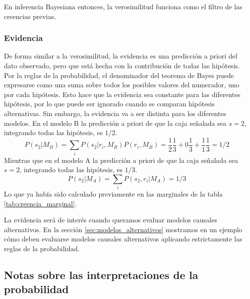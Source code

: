 \documentclass[a4paper,10pt]{book}
\theoremstyle{definition}
\begin{document}

En inferencia Bayesiana entonces, la verosimilitud funciona como el filtro de las creencias previas. 

\subsubsection*{Evidencia}

De forma similar a la verosimilitud, la evidencia es una predicci\'on a priori del dato observado, pero que est\'a hecha con la contribuci\'on de todas las hip\'otesis.
%
Por la reglas de la probabilidad, el denominador del teorema de Bayes puede expresarse como una suma sobre todos los posibles valores del numerador, uno por cada hip\'otesis.
%
Esto hace que la evidencia sea constante para las diferentes hip\'otesis, por lo que puede ser ignorado cuando se comparan hip\'otesis alternativas.
%
Sin embargo, la evidencia va a ser distinta para los diferentes modelos.
%
En el modelo B la predicci\'on a priori de que la caja se\~nalada sea $s=2$, integrando todas las hip\'otesis, es $1/2$. 
%
\begin{equation}
P(s_2|M_B) = \sum_i P(s_2|r_i, M_B) P(r_i, M_B) = \frac{1}{2} \frac{1}{3} + 0 \frac{1}{3} + \frac{1}{1} \frac{1}{3} = 1/2 
\end{equation}
%
Mientras que en el modelo A la predicci\'on a priori de que la caja se\~nalada sea $s=2$, integrando todas las hip\'otesis, es $1/3$. 
%
\begin{equation}
P(s_2|M_A) = \sum_i P(s_2,r_i| M_A) = 1/3 
\end{equation}
%
Lo que ya hab\'ia sido calculado previamente en las marginales de la tabla \ref{tab:creencia_marginal}.


La evidencia ser\'a de inter\'es cuando queramos evaluar modelos causales alternativos.
%
En la secci\'on \ref{sec:modelos_alternativos} mostramos en un ejemplo c\'omo deben evaluarse modelos causales alternativos aplicando estrictamente las reglas de la probabilidad.


\subsection{Notas sobre las interpretaciones de la probabilidad}
% 
% 
\end{document}
